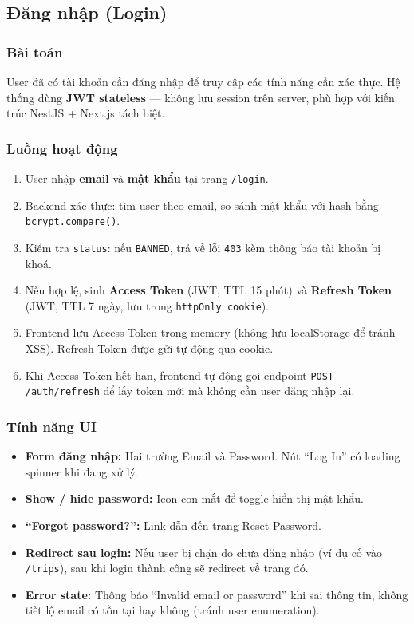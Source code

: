 \documentclass[12pt,a4paper]{article}
\begin{document}
\subsection{Đăng nhập (Login)}

\subsubsection{Bài toán}

User đã có tài khoản cần đăng nhập để truy cập các tính năng cần xác thực.
Hệ thống dùng \textbf{JWT stateless} --- không lưu session trên server, phù
hợp với kiến trúc NestJS + Next.js tách biệt.

\subsubsection{Luồng hoạt động}

\begin{enumerate}
  \item User nhập \textbf{email} và \textbf{mật khẩu} tại trang
        \texttt{/login}.
  \item Backend xác thực: tìm user theo email, so sánh mật khẩu với hash
        bằng \texttt{bcrypt.compare()}.
  \item Kiểm tra \texttt{status}: nếu \texttt{BANNED}, trả về lỗi
        \texttt{403} kèm thông báo tài khoản bị khoá.
  \item Nếu hợp lệ, sinh \textbf{Access Token} (JWT, TTL 15 phút) và
        \textbf{Refresh Token} (JWT, TTL 7 ngày, lưu trong
        \texttt{httpOnly cookie}).
  \item Frontend lưu Access Token trong memory (không lưu localStorage để
        tránh XSS). Refresh Token được gửi tự động qua cookie.
  \item Khi Access Token hết hạn, frontend tự động gọi endpoint
        \texttt{POST /auth/refresh} để lấy token mới mà không cần user
        đăng nhập lại.
\end{enumerate}

\subsubsection{Tính năng UI}

\begin{itemize}
  \item \textbf{Form đăng nhập:} Hai trường Email và Password.
        Nút ``Log In'' có loading spinner khi đang xử lý.
  \item \textbf{Show / hide password:} Icon con mắt để toggle hiển thị
        mật khẩu.
  \item \textbf{``Forgot password?'':} Link dẫn đến trang Reset Password.
  \item \textbf{Redirect sau login:} Nếu user bị chặn do chưa đăng nhập
        (ví dụ cố vào \texttt{/trips}), sau khi login thành công sẽ
        redirect về trang đó.
  \item \textbf{Error state:} Thông báo ``Invalid email or password'' khi
        sai thông tin, không tiết lộ email có tồn tại hay không (tránh
        user enumeration).
\end{itemize}
\end{document}
